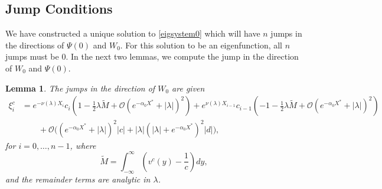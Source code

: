 \documentclass[10pt,reqno]{amsart}
\theoremstyle{plain}
\newtheorem{lemma}[theorem]{Lemma}
\theoremstyle{definition}
\theoremstyle{remark}
\numberwithin{theorem}{section}
\numberwithin{equation}{section}
\begin{document}
\subsection{Jump Conditions}

We have constructed a unique solution to \cref{eigsystem0} which will have $n$ jumps in the directions of $\Psi(0)$ and $W_0$. For this solution to be an eigenfunction, all $n$ jumps must be 0. In the next two lemmas, we compute the jump in the direction of $W_0$ and $\Psi(0)$. 

\begin{lemma}\label{jumpcenteradj}
The jumps in the direction of $W_0$ are given 
\begin{equation}\label{jumpW0}
\begin{aligned}
\xi^c_i &= e^{-\nu(\lambda)X_i}c_i\left( 1 - \frac{1}{2}\lambda \tilde{M} + \mathcal{O}(e^{-\alpha_0 X^*} + |\lambda|)^2 \right) 
+ e^{\nu(\lambda)X_{i-1}}c_{i-1}\left( -1 - \frac{1}{2}\lambda \tilde{M} + \mathcal{O}(e^{-\alpha_0 X^*} + |\lambda|)^2 \right) \\
&\qquad+ \mathcal{O}\Big( (e^{-\alpha_0 X^*} + |\lambda|)^2 |c| + |\lambda| (|\lambda| + e^{-\alpha_0 X^*})^2 |d| \Big),
\end{aligned}
\end{equation}
for $i = 0, \dots, n-1$, where
\[
\tilde{M} = \int_{-\infty}^{\infty} \left(v^c(y) - \frac{1}{c}\right) dy,
\]
and the remainder terms are analytic in $\lambda$.


\end{lemma}
\end{document}
